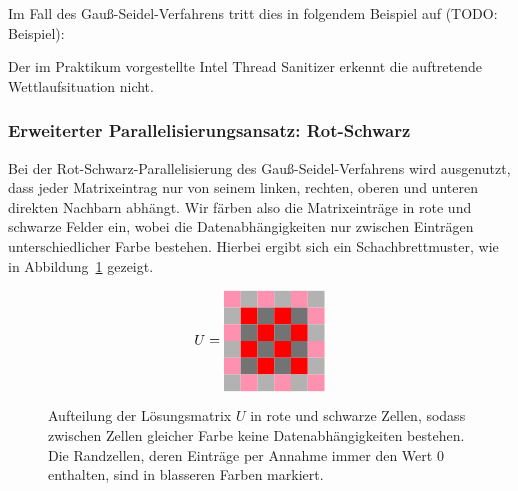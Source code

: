 \documentclass{article}
\begin{document}
Im Fall des Gauß-Seidel-Verfahrens tritt dies in folgendem Beispiel auf (TODO: Beispiel):


Der im Praktikum vorgestellte Intel Thread Sanitizer erkennt die auftretende Wettlaufsituation nicht.

\subsubsection{Erweiterter Parallelisierungsansatz: Rot-Schwarz}

Bei der Rot-Schwarz-Parallelisierung des Gauß-Seidel-Verfahrens wird ausgenutzt, dass jeder Matrixeintrag nur von seinem linken, rechten, oberen und unteren direkten Nachbarn abhängt. Wir färben also die Matrixeinträge in rote und schwarze Felder ein, wobei die Datenabhängigkeiten nur zwischen Einträgen unterschiedlicher Farbe bestehen. Hierbei ergibt sich ein Schachbrettmuster, wie in Abbildung~\ref{fig:matrix} gezeigt.

\begin{figure}[h!]
\centering
$$U = 
\begin{tabular}{cccccc}
  \cellcolor{rose} & \cellcolor[gray]{0.7} & \cellcolor{rose} & \cellcolor[gray]{0.7} & \cellcolor{rose} & \cellcolor[gray]{0.7}\\
 \cellcolor[gray]{0.7} & \cellcolor{red} & \cellcolor[gray]{0.45} & \cellcolor{red} & \cellcolor[gray]{0.45} & \cellcolor{rose}\\
  \cellcolor{rose} & \cellcolor[gray]{0.45} & \cellcolor{red} & \cellcolor[gray]{0.45} & \cellcolor{red} & \cellcolor[gray]{0.7}\\
 \cellcolor[gray]{0.7} & \cellcolor{red} & \cellcolor[gray]{0.45} & \cellcolor{red} & \cellcolor[gray]{0.45} & \cellcolor{rose} \\
 \cellcolor{rose} & \cellcolor[gray]{0.45} & \cellcolor{red} & \cellcolor[gray]{0.45} & \cellcolor{red} & \cellcolor[gray]{0.7}\\
 \cellcolor[gray]{0.7} & \cellcolor{rose} & \cellcolor[gray]{0.7} & \cellcolor{rose} & \cellcolor[gray]{0.7} & \cellcolor{rose}\\
\end{tabular}
$$
\caption{Aufteilung der Lösungsmatrix $U$ in rote und schwarze Zellen, sodass zwischen Zellen gleicher Farbe keine Datenabhängigkeiten bestehen. Die Randzellen, deren Einträge per Annahme immer den Wert $0$ enthalten, sind in blasseren Farben markiert.}
\label{fig:matrix}
\end{figure}
\end{document}
